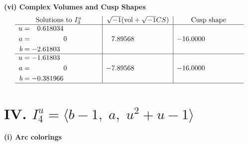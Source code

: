 \documentclass[1p]{elsarticle_modified}
\theoremstyle{definition}
\newcommand{\I}{\sqrt{-1}}
\begin{document}
\newpage\flushleft \textbf{(vi) Complex Volumes and Cusp Shapes}
$$\begin{array}{c|c|c}  
\text{Solutions to }I^u_{3}& \I (\text{vol} + \sqrt{-1}CS) & \text{Cusp shape}\\
 \hline 
\begin{aligned}
u &= \phantom{-}0.618034\phantom{ +0.000000I} \\
a &= \phantom{-0.000000 } 0 \\
b &= -2.61803\phantom{ +0.000000I}\end{aligned}
 & \phantom{-}7.89568\phantom{ +0.000000I} & -16.0000\phantom{ +0.000000I} \\ \hline\begin{aligned}
u &= -1.61803\phantom{ +0.000000I} \\
a &= \phantom{-0.000000 } 0 \\
b &= -0.381966\phantom{ +0.000000I}\end{aligned}
 & -7.89568\phantom{ +0.000000I} & -16.0000\phantom{ +0.000000I}\\
 \hline 
 \end{array}$$\newpage\newpage\renewcommand{\arraystretch}{1}
\centering \section*{IV. $I^u_{4}= \langle b-1,\;a,\;u^2+u-1 \rangle$}
\flushleft \textbf{(i) Arc colorings}\\
\end{document}
